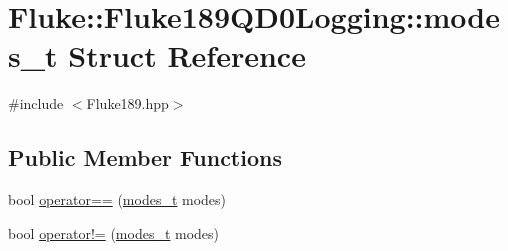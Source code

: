 \hypertarget{structFluke_1_1Fluke189QD0Logging_1_1modes__t}{
\section{Fluke::Fluke189QD0Logging::modes\_\-t Struct Reference}
\label{structFluke_1_1Fluke189QD0Logging_1_1modes__t}
}


{\ttfamily \#include $<$Fluke189.hpp$>$}\subsection*{Public Member Functions}
\begin{DoxyCompactItemize}
\item 
bool \hyperlink{structFluke_1_1Fluke189QD0Logging_1_1modes__t_a65967f61529859ff86e92dc060199b2e}{operator==} (\hyperlink{structFluke_1_1Fluke189QD0Logging_1_1modes__t}{modes\_\-t} modes)
\item 
bool \hyperlink{structFluke_1_1Fluke189QD0Logging_1_1modes__t_a0dff151c2a364e53b9fc1dfcbda878b7}{operator!=} (\hyperlink{structFluke_1_1Fluke189QD0Logging_1_1modes__t}{modes\_\-t} modes)
\end{DoxyCompactItemize}
